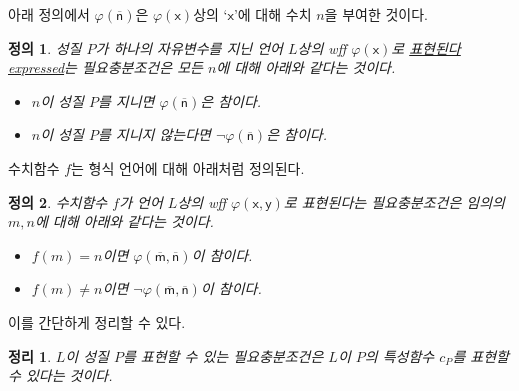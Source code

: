 \documentclass[a4paper,chapter,atbegshi]{oblivoir}
\newtheorem{defn}{정의}[chapter]
\newtheorem{theo}{정리}[chapter]
\begin{document}
아래 정의에서 $\mathsf{\varphi(\overline{n})}$은 $\mathsf{\varphi(x)}$상의
`$\mathsf{x}$'에 대해 수치 $n$을 부여한 것이다.
\begin{defn}\label{defn:1-14}
  성질 $P$가 하나의 자유변수를 지닌 언어 $L$상의 wff $\varphi(\mathsf{x})$로
  \underline{표현된다{\tiny expressed}}는 필요충분조건은 모든 $n$에 대해 아래와
  같다는 것이다.
  \begin{itemize}
    \item $n$이 성질 $P$를 지니면 $\varphi(\mathsf{\overline{n}})$은 참이다.
    \item $n$이 성질 $P$를 지니지 않는다면 $\neg\varphi(\mathsf{\overline{n}})$은
      참이다.
  \end{itemize}
\end{defn}
수치함수 $f$는 형식 언어에 대해 아래처럼 정의된다.
\begin{defn}\label{defn:1-15}
  수치함수 $f$가 언어 $L$상의 wff $\varphi(\mathsf{x,y})$로 표현된다는
  필요충분조건은 임의의 $m,n$에 대해 아래와 같다는 것이다.
  \begin{itemize}
    \item $f(m)=n$이면 $\varphi(\mathsf{\overline{m},\overline{n}})$이 참이다.
    \item $f(m)\neq n$이면 $\neg\varphi(\mathsf{\overline{m},\overline{n}})$이
      참이다.
  \end{itemize}
\end{defn}
이를 간단하게 정리할 수 있다.
\begin{theo}\label{theo:1-14}
  $L$이 성질 $P$를 표현할 수 있는 필요충분조건은
  $L$이 $P$의 특성함수 $c_P$를 표현할 수 있다는 것이다.
\end{theo}
\end{document}
